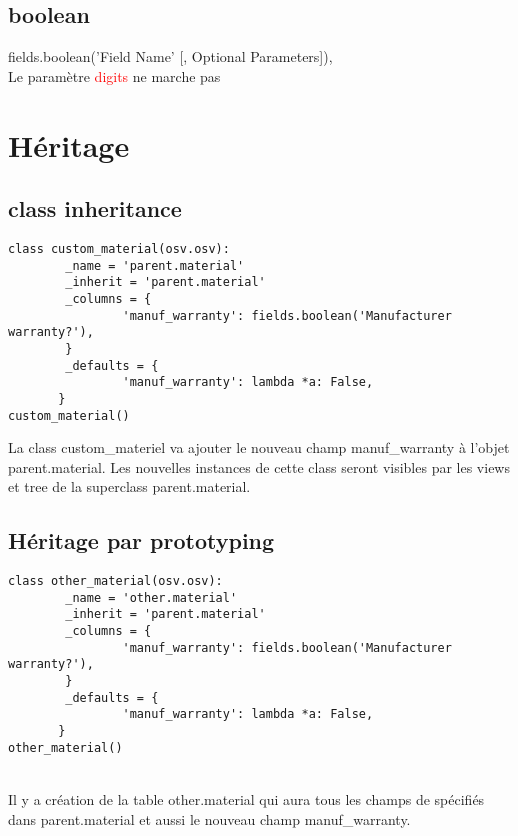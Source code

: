\documentclass[12pt,a4paper]{article}
\begin{document}
\subsection{boolean}
\label{sec:bool}

fields.boolean('Field Name' [, Optional Parameters]),\\
Le paramètre \textcolor{red}{digits} ne marche pas 

\section{Héritage}
\label{sec:inherit}

\subsection{class inheritance}
\label{sec:inheritance}

\begin{verbatim}
class custom_material(osv.osv):
        _name = 'parent.material'
        _inherit = 'parent.material'
        _columns = {
                'manuf_warranty': fields.boolean('Manufacturer warranty?'),
        }
        _defaults = {
                'manuf_warranty': lambda *a: False,
       }
custom_material()
\end{verbatim}



La class custom\_materiel va ajouter le nouveau champ manuf\_warranty à l'objet parent.material. Les nouvelles instances de cette class seront visibles par les views et tree de la superclass parent.material.

\subsection{Héritage par prototyping}
\label{sec:prototype}

\begin{verbatim}
class other_material(osv.osv):
        _name = 'other.material'
        _inherit = 'parent.material'
        _columns = {
                'manuf_warranty': fields.boolean('Manufacturer warranty?'),
        }
        _defaults = {
                'manuf_warranty': lambda *a: False,
       }
other_material()
\end{verbatim}


 \\


Il y a création de la table other.material qui aura tous les champs de spécifiés dans parent.material et aussi le nouveau champ manuf\_warranty.
\end{document}
